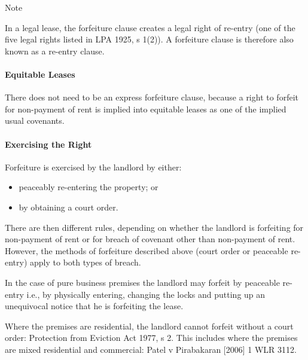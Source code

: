 \documentclass[
]{article}
\providecommand{\tightlist}{%
  \setlength{\itemsep}{0pt}\setlength{\parskip}{0pt}}
\newenvironment{env-ab94a4ec-2f9e-4d2f-94d1-74521d1a190e}
{
    \savenotes\tcolorbox[blanker,breakable,left=5pt,borderline west={2pt}{-4pt}{blue}]
}
{
    \endtcolorbox\spewnotes
}
\begin{document}
\begin{env-ab94a4ec-2f9e-4d2f-94d1-74521d1a190e}

Note

In a legal lease, the forfeiture clause creates a legal right of
re-entry (one of the five legal rights listed in LPA 1925, s 1(2)). A
forfeiture clause is therefore also known as a re-entry clause.

\end{env-ab94a4ec-2f9e-4d2f-94d1-74521d1a190e}

\hypertarget{equitable-leases-1}{%
\paragraph{Equitable Leases}\label{equitable-leases-1}}

There does not need to be an express forfeiture clause, because a right
to forfeit for non-payment of rent is implied into equitable leases as
one of the implied usual covenants.

\hypertarget{exercising-the-right}{%
\paragraph{Exercising the Right}\label{exercising-the-right}}

Forfeiture is exercised by the landlord by either:

\begin{itemize}
\tightlist
\item
  peaceably re-entering the property; or
\item
  by obtaining a court order.
\end{itemize}

There are then different rules, depending on whether the landlord is
forfeiting for non-payment of rent or for breach of covenant other than
non-payment of rent. However, the methods of forfeiture described above
(court order or peaceable re-entry) apply to both types of breach.

In the case of pure business premises the landlord may forfeit by
peaceable re-entry i.e., by physically entering, changing the locks and
putting up an unequivocal notice that he is forfeiting the lease.

Where the premises are residential, the landlord cannot forfeit without
a court order: Protection from Eviction Act 1977, s 2. This includes
where the premises are mixed residential and commercial: Patel v
Pirabakaran {[}2006{]} 1 WLR 3112.
\end{document}
